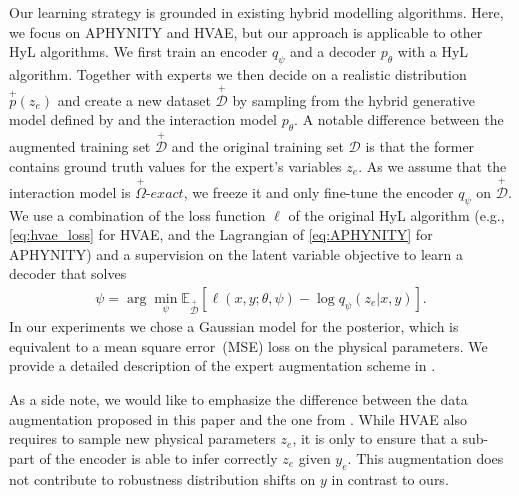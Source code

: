 Our learning strategy is grounded in existing hybrid modelling algorithms. Here, we focus on APHYNITY and HVAE, but our approach is applicable to other HyL algorithms. We first train an encoder $q_\psi$ and a decoder $p_\theta$ with a HyL algorithm. Together with experts we then decide on a realistic distribution $\overset{+}{p}(z_e)$ and create a new dataset $\overset{+}{\mathcal{D}}$ by sampling from the hybrid generative model defined by  and the interaction model $p_\theta$. A notable difference between the augmented training set $\overset{+}{\mathcal{D}}$ and the original training set $\mathcal{D}$ is that the former contains ground truth values for the expert's variables $z_e$. As we assume that the interaction model is $\overset{+}{\Omega}\textit{-exact}$, we freeze it and only fine-tune the encoder $q_\psi$ on $\overset{+}{\mathcal{D}}$. We use a combination of the loss function $\ell$ of the original HyL algorithm (e.g., \eqref{eq:hvae_loss} for HVAE, and the Lagrangian of \eqref{eq:APHYNITY} for APHYNITY) and a supervision on the latent variable objective to learn a decoder that solves
\begin{align}
    \psi = \arg\min_{\psi} \mathbb{E}_{\overset{+}{\mathcal{D}}}\left[ \ell(x, y; \theta, \psi) - \log q_\psi(z_e|x, y) \right]. \nonumber
\end{align}
In our experiments we chose a Gaussian model for the posterior, which is equivalent to a mean square error~(MSE) loss on the physical parameters. We provide a detailed description of the expert augmentation scheme in .

As a side note, we would like to emphasize the difference between the data augmentation proposed in this paper and the one from \citet{HVAE}. While HVAE also requires to sample new physical parameters $z_e$, it is only to ensure that a sub-part of the encoder is able to infer correctly $z_e$ given $y_e$. This augmentation does not contribute to robustness distribution shifts on $y$ in contrast to ours.

